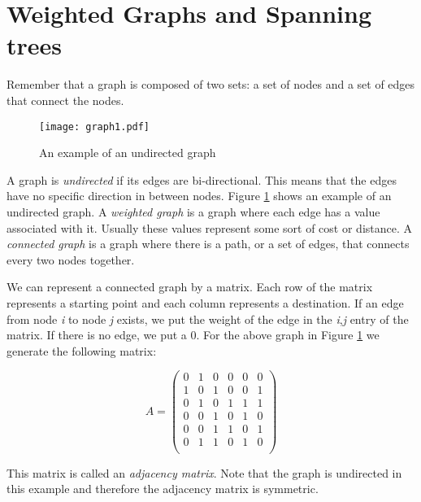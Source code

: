 \label{Ch:Kruskal}


\section*{Weighted Graphs and Spanning trees}

Remember that a graph is composed of two sets: a set of nodes and a set of edges that connect the nodes.

\begin{figure}[H]
\texttt{[image: graph1.pdf]}
\caption{An example of an undirected graph}
\label{fig:graph1}
\end{figure}

A graph is \emph{undirected} if its edges are bi-directional. This means that the edges have no specific direction in between nodes. Figure
\ref{fig:graph1} shows an example of an undirected graph.
A \emph{weighted graph} is a graph where each edge has a value associated with it.
Usually these values represent some sort of cost or distance.
A \emph{connected graph} is a graph where there is a path, or a set of edges, that connects every two nodes together.

We can represent a connected graph by a matrix.
Each row of the matrix represents a starting point and each column represents a destination.
If an edge from node \emph{i} to node \emph{j} exists, we put the weight of the edge in the \emph{i},\emph{j} entry of the matrix.
If there is no edge, we put a 0.
For the above graph in Figure \ref{fig:graph1} we generate the following matrix:

\[
A = \begin{pmatrix}
0 & 1 & 0 & 0 & 0 & 0\\
1 & 0 & 1 & 0 & 0 & 1\\
0 & 1 & 0 & 1 & 1 & 1\\
0 & 0 & 1 & 0 & 1 & 0\\
0 & 0 & 1 & 1 & 0 & 1\\
0 & 1 & 1 & 0 & 1 & 0\\
\end{pmatrix}
\]

This matrix is called an \emph{adjacency matrix}.
Note that the graph is undirected in this example and therefore the adjacency matrix is symmetric.

